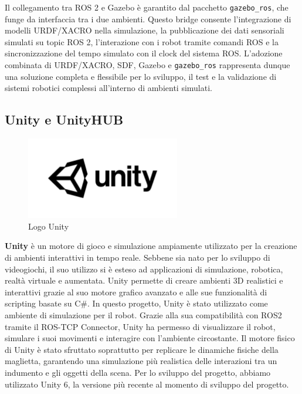 \documentclass[11pt]{report}
\begin{document}
Il collegamento tra ROS 2 e Gazebo è garantito dal pacchetto \texttt{gazebo\_ros}, che funge da interfaccia tra i due ambienti. Questo bridge consente l’integrazione di modelli URDF/XACRO nella simulazione, la pubblicazione dei dati sensoriali simulati su topic ROS 2, l’interazione con i robot tramite comandi ROS e la sincronizzazione del tempo simulato con il clock del sistema ROS. L’adozione combinata di URDF/XACRO, SDF, Gazebo e \texttt{gazebo\_ros} rappresenta dunque una soluzione completa e flessibile per lo sviluppo, il test e la validazione di sistemi robotici complessi all’interno di ambienti simulati.



\subsection{Unity e UnityHUB}

\begin{figure}[H]
    \centering
    \includegraphics[width=0.6\textwidth]{images/UNITY.jpg}
    \caption{Logo Unity}
    \label{fig:UNITY}
\end{figure}

\textbf{Unity} \cite{Unity} è un motore di gioco e simulazione ampiamente utilizzato per la creazione di ambienti interattivi in tempo reale. Sebbene sia nato per lo sviluppo di videogiochi, il suo utilizzo si è esteso ad applicazioni di simulazione, robotica, realtà virtuale e aumentata. Unity permette di creare ambienti 3D realistici e interattivi grazie al suo motore grafico avanzato e alle sue funzionalità di scripting basate su C\#.
In questo progetto, Unity è stato utilizzato come ambiente di simulazione per il robot. Grazie alla sua compatibilità con ROS2 tramite il ROS-TCP Connector, Unity ha permesso di visualizzare il robot, simulare i suoi movimenti e interagire con l'ambiente circostante. Il motore fisico di Unity è stato sfruttato soprattutto per replicare le dinamiche fisiche della maglietta, garantendo una simulazione più realistica delle interazioni tra un indumento e gli oggetti della scena.
Per lo sviluppo del progetto, abbiamo utilizzato Unity 6, la versione più recente al momento di sviluppo del progetto.
\end{document}
